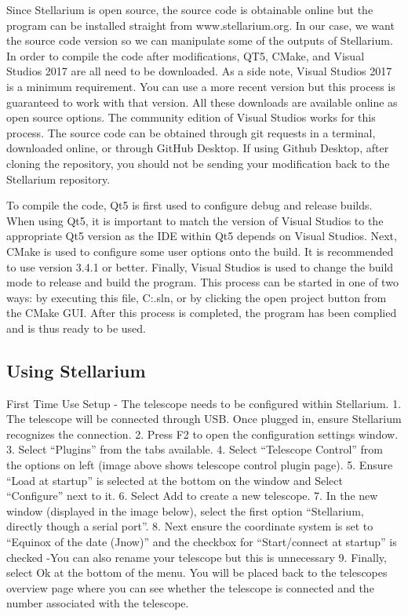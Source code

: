 \documentclass[12pt]{report}
\begin{document}
Since Stellarium is open source, the source code is obtainable online but the program can be installed straight from www.stellarium.org. In our case, we want the source code version so we can manipulate some of the outputs of Stellarium. In order to compile the code after modifications, QT5, CMake, and Visual Studios 2017 are all need to be downloaded. As a side note, Visual Studios 2017 is a minimum requirement. You can use a more recent version but this process is guaranteed to work with that version. All these downloads are available online as open source options. The community edition of Visual Studios works for this process. The source code can be obtained through git requests in a terminal, downloaded online, or through GitHub Desktop. If using Github Desktop, after cloning the repository, you should not be sending your modification back to the Stellarium repository.

To compile the code, Qt5 is first used to configure debug and release builds. When using Qt5, it is important to match the version of Visual Studios to the appropriate Qt5 version as the IDE within Qt5 depends on Visual Studios. Next, CMake is used to configure some user options onto the build. It is recommended to use version 3.4.1 or better. Finally, Visual Studios is used to change the build mode to release and build the program. This process can be started in one of two ways: by executing this file, C:\Devel\stellarium\builds{}\Stellarium.sln, or by clicking the open project button from the CMake GUI. After this process is completed, the program has been complied and is thus ready to be used.

\subsection{Using Stellarium}

First Time Use Setup - The telescope needs to be configured within Stellarium.
	1. The telescope will be connected through USB. Once plugged in, ensure Stellarium recognizes the connection.
  2. Press F2 to open the configuration settings window.
  3. Select “Plugins” from the tabs available.
  4. Select “Telescope Control” from the options on left (image above shows telescope control plugin page).
  5. Ensure “Load at startup” is selected at the bottom on the window and Select “Configure” next to it.
  6. Select Add to create a new telescope.
  7. In the new window (displayed in the image below), select the first option “Stellarium, directly though a serial port”.
  8. Next ensure the coordinate system is set to “Equinox of the date (Jnow)” and the checkbox for “Start/connect at startup” is checked
    -You can also rename your telescope but this is unnecessary
  9. Finally, select Ok at the bottom of the menu. You will be placed back to the telescopes overview page where you can see whether the telescope is connected and the number associated with the telescope.
\end{document}
